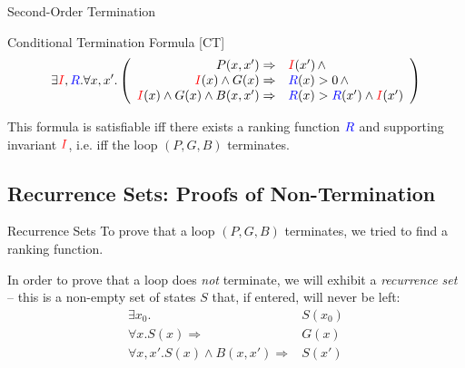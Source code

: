 \documentclass[xcolor=pdftex,t,11pt]{beamer}
\newcommand{\red}[1]{\textcolor{red}{#1}}
\newcommand{\blue}[1]{\textcolor{blue}{#1}}
\begin{document}
\begin{frame}{Second-Order Termination}

\begin{block}{Conditional Termination Formula [CT]}
 \[
 \exists \red{I}, \blue{R} .  \forall x, x' . \left ( \begin{array}{rl}
   P(x, x') \Rightarrow & \red{I}(x') \, \wedge \\
   \red{I}(x) \wedge G(x) \Rightarrow & \blue{R}(x) > 0 \, \wedge \\
   \red{I}(x) \wedge G(x) \wedge B(x, x') \Rightarrow & \blue{R}(x) > \blue{R}(x') \wedge \red{I}(x')
   \end{array} \right )
 \]
 \end{block}

 \vspace{1em}

This formula is satisfiable iff there exists a ranking function $\blue{R}$ and supporting invariant $\red{I}$,
i.e. iff the loop $(P, G, B)$ terminates.
 
\end{frame}


\subsection{Recurrence Sets: Proofs of Non-Termination}

\begin{frame}{Recurrence Sets}
 To prove that a loop $(P, G, B)$ terminates, we tried to find a ranking function.

 \vspace{1em}

 In order to prove that a loop does \emph{not} terminate, we will exhibit a \emph{recurrence set} --
 this is a non-empty set of states $S$ that, if entered, will never be left:
 \begin{align*}
  \exists x_0 . & S(x_0) \\
  \forall x . S(x) \Rightarrow & G(x) \\
  \forall x, x' . S(x) \wedge B(x, x') \Rightarrow & S(x')
 \end{align*}

\end{frame}
\end{document}
